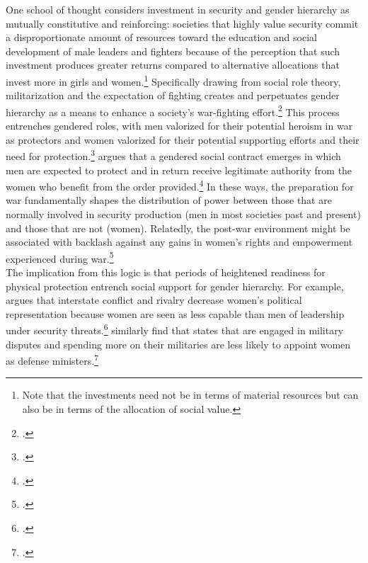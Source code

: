 \documentclass [12pt] {article}
\begin{document}
One school of thought considers investment in security and gender hierarchy as mutually constitutive and reinforcing: societies that highly value security commit a disproportionate amount of resources toward the education and social development of male leaders and fighters because of the perception that such investment produces greater returns compared to alternative allocations that invest more in girls and women.\footnote{Note that the investments need not be in terms of material resources but can also be in terms of the allocation of social value.} Specifically drawing from social role theory, militarization and the expectation of fighting creates and perpetuates gender hierarchy as a means to enhance a society's war-fighting effort.\footnote{.} This process entrenches gendered roles, with men valorized for their potential heroism in war as protectors and women valorized for their potential supporting efforts and their need for protection.\footnote{.} \citeauthor{pateman2014sexual} argues that a gendered social contract emerges in which men are expected to protect and in return receive legitimate authority from the women who benefit from the order provided.\footnote{.} In these ways, the preparation for war fundamentally shapes the distribution of power between those that are normally involved in security production (men in most societies past and present) and those that are not (women).  Relatedly, the post-war environment might be associated with backlash against any gains in women's rights and empowerment experienced during war.\footnote{.}\\

The implication from this logic is that periods of heightened readiness for physical protection entrench social support for gender hierarchy. For example, \citeauthor{schroeder2015security} argues that interstate conflict and rivalry decrease women's political representation because women are seen as less capable than men of leadership under security threats.\footnote{.} \citeauthor{barnes:obrien} similarly find that states that are engaged in military disputes and spending more on their militaries are less likely to appoint women as defense ministers.\footnote{.}  \\
\end{document}
